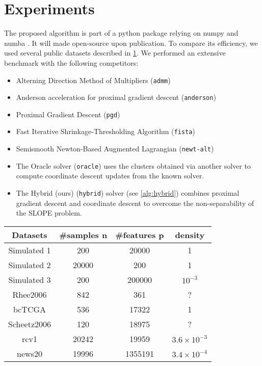 \section{Experiments}\label{sec:experiments}

The proposed algorithm is part of a python package relying on numpy and numba \cite{harris2020,lam2015}.
It will made open-source upon publication. To compare its efficiency, we used several public datasets described in \cref{table:datasets}.
We performed an extensive benchmark with the following competitors:
\begin{itemize}[noitemsep]
  \item Alterning Direction Method of Multipliers (\texttt{admm}) \cite{boyd2010}
  \item Anderson acceleration for proximal gradient descent (\texttt{anderson}) \cite{zhang2020}
  \item Proximal Gradient Descent (\texttt{pgd}) \cite{combettes2005}
  \item Fast Iterative Shrinkage-Thresholding Algorithm (\texttt{fista}) \cite{beck2009}
  \item Semismooth Newton-Based Augmented Lagrangian (\texttt{newt-alt}) \cite{Ziyan2019}
  \item The Oracle solver (\texttt{oracle}) uses the clusters obtained via another
   solver to compute coordinate descent updates from the known solver.
  \item The Hybrid (ours) (\texttt{hybrid}) solver (see \cref{alg:hybrid}) combines proximal gradient descent
   and coordinate descent to overcome the non-separability of the SLOPE problem.
\end{itemize}

\begin{table}[]
    \centering
    \label{table:datasets}
    \begin{tabular}{cccc}
    \hline
    Datasets    & \#samples n & \#features p & density \\ \hline
    Simulated 1 & 200 & \num{20000} & 1 \\
    Simulated 2 & \num{20000} & \num{200} & 1 \\
    Simulated 3 & 200 & \num{200000} & $10^{-3}$ \\ 
    Rhee2006    & 842         & 361          & ?       \\ 
    bcTCGA      & 536         & \num{17322}        & 1       \\
    Scheetz2006 & 120         & \num{18975}        & ?       \\
    rcv1 & \num{20242} & \num{19959} & $3.6 \times 10^{-3}$ \\ 
    news20 & \num{19996} & \num{1355191} & $3.4 \times 10^{-4}$ \\\hline
    \end{tabular}
\end{table}

